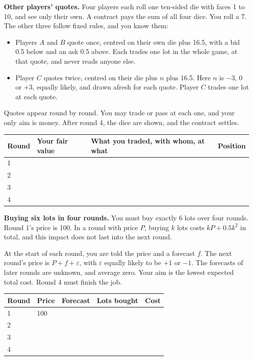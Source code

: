 \begin{question}\label{iq:iv2:played-games:10}
\textbf{Other players' quotes.} Four players each roll one ten-sided die with faces 1 to 10, and see only their own. A contract pays the sum of all four dice. You roll a 7. The other three follow fixed rules, and you know them:
\begin{itemize}
\item Players $A$ and $B$ quote once, centred on their own die plus 16.5, with a bid 0.5 below and an ask 0.5 above. Each trades one lot in the whole game, at that quote, and never reads anyone else.
\item Player $C$ quotes twice, centred on their die plus $n$ plus 16.5. Here $n$ is $-3$, 0 or $+3$, equally likely, and drawn afresh for each quote. Player $C$ trades one lot at each quote.
\end{itemize}
Quotes appear round by round. You may trade or pass at each one, and your only aim is money. After round 4, the dice are shown, and the contract settles.

\medskip
\begin{tabular}{@{}l|l|p{5cm}|l@{}}
Round & Your fair value & What you traded, with whom, at what & Position \\ \hline
1 & & & \\[8pt]\hline
2 & & & \\[8pt]\hline
3 & & & \\[8pt]\hline
4 & & & \\[8pt]\hline
\end{tabular}
\end{question}
\vfill\clearpage

\begin{question}\label{iq:iv2:played-games:11}
\textbf{Buying six lots in four rounds.} You must buy exactly 6 lots over four rounds. Round 1's price is 100. In a round with price $P$, buying $k$ lots costs $kP + 0.5k^2$ in total, and this impact does not last into the next round.

At the start of each round, you are told the price and a forecast $f$. The next round's price is $P + f + \varepsilon$, with $\varepsilon$ equally likely to be $+1$ or $-1$. The forecasts of later rounds are unknown, and average zero. Your aim is the lowest expected total cost. Round 4 must finish the job.

\medskip
\begin{tabular}{@{}l|l|l|l|l@{}}
Round & Price & Forecast & Lots bought & Cost \\ \hline
1 & 100 & & & \\[8pt]\hline
2 & & & & \\[8pt]\hline
3 & & & & \\[8pt]\hline
4 & & & & \\[8pt]\hline
\end{tabular}
\end{question}
\vfill\clearpage

